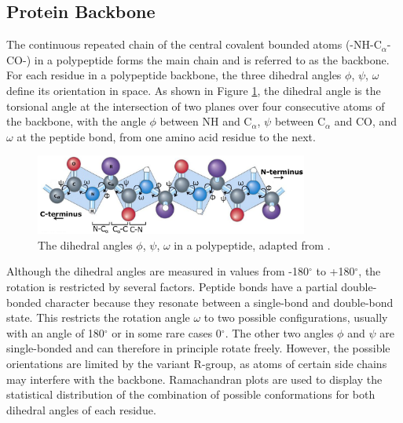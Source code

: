  



\subsection{Protein Backbone}
\label{ssec:backbone}

The continuous repeated chain of the central covalent bounded atoms \mbox{(-NH-C$_\alpha$-CO-)} in a polypeptide forms the main chain and is referred to as the backbone. 
For each residue in a polypeptide backbone, the three dihedral  angles $\phi$, $\psi$, $\omega$ define its orientation in space. As shown in Figure \ref{fig:dihedral}, the dihedral angle is the torsional angle at the intersection of two planes over four consecutive atoms of the backbone, with the angle $\phi$ between NH and C$_\alpha$, $\psi$  between C$_\alpha$ and CO, and $\omega$ at the peptide bond, from one amino acid residue to the next. 



\begin{figure}[h!]
	\begin{center}
		\includegraphics[width=0.8\textwidth]{fig/dihedral}
	\end{center}
	\caption[The dihedral angles $\phi$, $\psi$, $\omega$ in a polypeptide.]{The dihedral angles $\phi$, $\psi$, $\omega$ in a polypeptide, adapted from \cite{Nelson.2013}.}
	
	\label{fig:dihedral}
\end{figure} 

Although the dihedral angles are measured in values from -180$^{\circ}$ to +180$^{\circ}$, the rotation is restricted by several factors.  
Peptide bonds have a partial double-bonded character because they resonate between a single-bond and double-bond state. 
This restricts the rotation angle $\omega$ to two possible configurations, usually with an angle of 180$^{\circ}$ or in some rare cases 0$^{\circ}$. 
The other two angles $\phi$ and $\psi$ are single-bonded and can therefore in principle rotate freely. 
However, the possible orientations are limited by the variant R-group, as atoms of certain side chains may interfere with the backbone. Ramachandran plots are used to display the statistical distribution of the combination of possible conformations for both dihedral angles of each residue.


